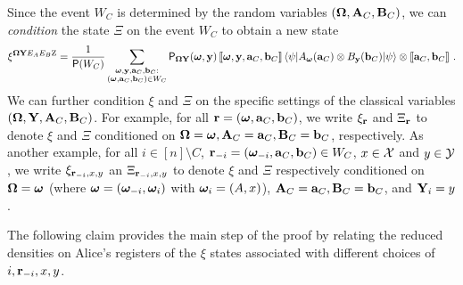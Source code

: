 Since the event $W_C$ is determined by the random variables $({\boldsymbol{\Omega}},\mathbf{A}_C,\mathbf{B}_C)$, we can \emph{condition} the state $\Xi$ on the event $W_C$ to obtain a new state
\[
	\xi^{{\boldsymbol{\Omega}} \mathbf{Y} E_A E_B \mathrm{Z}} = \frac{1}{\mathsf{P}(W_C)} \sum_{\substack{{\boldsymbol{\omega}}, \mathbf{y}, \mathbf{a}_C, \mathbf{b}_C: \\ ({\boldsymbol{\omega}},\mathbf{a}_C,\mathbf{b}_C) \in W_C}} \mathsf{P}_{{\boldsymbol{\Omega}} \mathbf{Y}}({\boldsymbol{\omega}}, \mathbf{y}) \, \llbracket {\boldsymbol{\omega}}, \mathbf{y}, \mathbf{a}_C, \mathbf{b}_C \rrbracket \, {\langle\psi|} A_{\boldsymbol{\omega}}(\mathbf{a}_C) \otimes B_{\mathbf{y}}(\mathbf{b}_C) {|\psi\rangle} \otimes \llbracket \mathbf{a}_C,\mathbf{b}_C \rrbracket~.
\]
We can further condition $\xi$ and $\Xi$ on the specific settings of the classical variables $({\boldsymbol{\Omega}},\mathbf{Y},\mathbf{A}_C,\mathbf{B}_C)$. For example, for all $\mathbf{r} = ({\boldsymbol{\omega}},\mathbf{a}_C,\mathbf{b}_C)$, we write $\xi_{\mathbf{r}}$ and $\Xi_{\mathbf{r}}$ to denote $\xi$ and $\Xi$ conditioned on ${\boldsymbol{\Omega}} = {\boldsymbol{\omega}}, \mathbf{A}_C = \mathbf{a}_C,\mathbf{B}_C = \mathbf{b}_C$, respectively. As another example, for all $i \in [n] \setminus C$, $\mathbf{r}_{-i} = ({\boldsymbol{\omega}}_{-i},\mathbf{a}_C,\mathbf{b}_C) \in W_C$, $x \in \mathcal{X}$ and $y \in \mathcal{Y}$, we write $\xi_{\mathbf{r}_{-i},x,y}$ an $\Xi_{\mathbf{r}_{-i},x,y}$ to denote $\xi$ and $\Xi$ respectively conditioned on ${\boldsymbol{\Omega}} = {\boldsymbol{\omega}}$ (where ${\boldsymbol{\omega}} = ({\boldsymbol{\omega}}_{-i},{\boldsymbol{\omega}}_i)$ with ${\boldsymbol{\omega}}_i = (A,x)$),  $\mathbf{A}_C = \mathbf{a}_C, \mathbf{B}_C = \mathbf{b}_C$, and $\mathbf{Y}_i = y$.
%

The following claim provides the main step of the proof by relating the reduced densities on Alice's registers of the $\xi$ states associated with different choices of $i,\mathbf{r}_{-i},x,y$. 

